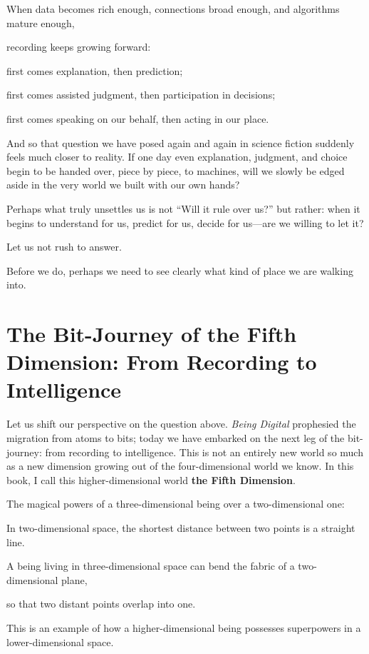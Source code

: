 When data becomes rich enough, connections broad enough, and algorithms mature enough,

recording keeps growing forward:

first comes explanation, then prediction;

first comes assisted judgment, then participation in decisions;

first comes speaking on our behalf, then acting in our place.

\vspace{1em}

And so that question we have posed again and again in science fiction suddenly feels much closer to reality.
If one day even explanation, judgment, and choice begin to be handed over, piece by piece, to machines, will we slowly be edged aside in the very world we built with our own hands?

Perhaps what truly unsettles us is not ``Will it rule over us?'' but rather: when it begins to understand for us, predict for us, decide for us---are we willing to let it?

\vspace{1em}

Let us not rush to answer.

Before we do, perhaps we need to see clearly what kind of place we are walking into.
\newpage
\section{The Bit-Journey of the Fifth Dimension: From Recording to Intelligence}

Let us shift our perspective on the question above. \textit{Being Digital} prophesied the migration from atoms to bits; today we have embarked on the next leg of the bit-journey: from recording to intelligence. This is not an entirely new world so much as a new dimension growing out of the four-dimensional world we know. In this book, I call this higher-dimensional world \textbf{the Fifth Dimension}.

\begin{myquote}
The magical powers of a three-dimensional being over a two-dimensional one:

In two-dimensional space, the shortest distance between two points is a straight line.

A being living in three-dimensional space can bend the fabric of a two-dimensional plane,

so that two distant points overlap into one.

This is an example of how a higher-dimensional being possesses superpowers in a lower-dimensional space.
\end{myquote}

